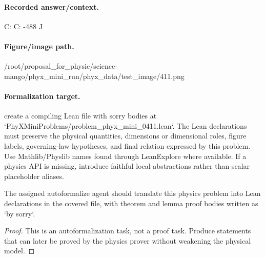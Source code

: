 \paragraph{Recorded answer/context.}
C: C: -488 J

\paragraph{Figure/image path.}
/root/proposal\_for\_physic/science-mango/phyx\_mini\_run/phyx\_data/test\_image/411.png

\paragraph{Formalization target.}
create a compiling Lean file with sorry bodies at `PhyXMiniProblems/problem\_phyx\_mini\_0411.lean`. The Lean declarations must preserve the physical quantities, dimensions or dimensional roles, figure labels, governing-law hypotheses, and final relation expressed by this problem.
Use Mathlib/Physlib names found through LeanExplore where available. If a physics API is missing, introduce faithful local abstractions rather than scalar placeholder aliases.

\begin{theorem}
\label{thm:physics:phyx_mini_0411:target}
The assigned autoformalize agent should translate this physics problem into Lean declarations in the covered file, with theorem and lemma proof bodies written as `by sorry`.
\end{theorem}
\begin{proof}
This is an autoformalization task, not a proof task. Produce statements that can later be proved by the physics prover without weakening the physical model.
\end{proof}


